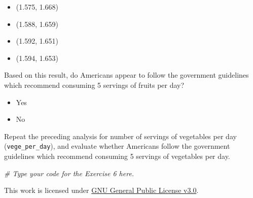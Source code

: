 \documentclass[
]{article}
\newenvironment{Shaded}{\begin{snugshade}}{\end{snugshade}}
\newcommand{\CommentTok}[1]{\textcolor[rgb]{0.56,0.35,0.01}{\textit{#1}}}
\providecommand{\tightlist}{%
  \setlength{\itemsep}{0pt}\setlength{\parskip}{0pt}}
\begin{document}
\begin{itemize}
\tightlist
\item
  (1.575, 1.668)
\item
  (1.588, 1.659)
\item
  (1.592, 1.651)
\item
  (1.594, 1.653)
\end{itemize}

Based on this result, do Americans appear to follow the government
guidelines which recommend consuming 5 servings of fruits per day?

\begin{itemize}
\tightlist
\item
  Yes
\item
  No
\end{itemize}

Repeat the preceding analysis for number of servings of vegetables per
day (\texttt{vege\_per\_day}), and evaluate whether Americans follow the
government guidelines which recommend consuming 5 servings of vegetables
per day.

\begin{Shaded}
\begin{Highlighting}[]
\CommentTok{# Type your code for the Exercise 6 here.}
\end{Highlighting}
\end{Shaded}

This work is licensed under
\href{https://www.gnu.org/licenses/quick-guide-gplv3.html}{GNU General
Public License v3.0}.
\end{document}
